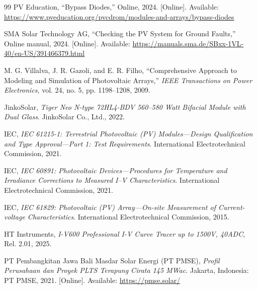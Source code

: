 \begin{thebibliography}{99}
PV Education, ``Bypass Diodes,'' Online, 2024. [Online]. Available: \url{https://www.pveducation.org/pvcdrom/modules-and-arrays/bypass-diodes}

SMA Solar Technology AG, ``Checking the PV System for Ground Faults,'' Online manual, 2024. [Online]. Available: \url{https://manuals.sma.de/SBxx-1VL-40/en-US/391466379.html}

M. G. Villalva, J. R. Gazoli, and E. R. Filho, ``Comprehensive Approach to Modeling and Simulation of Photovoltaic Arrays,'' \textit{IEEE Transactions on Power Electronics}, vol. 24, no. 5, pp. 1198--1208, 2009.

JinkoSolar, \textit{Tiger Neo N-type 72HL4-BDV 560--580 Watt Bifacial Module with Dual Glass}. JinkoSolar Co., Ltd., 2022.

IEC, \textit{IEC 61215-1: Terrestrial Photovoltaic (PV) Modules---Design Qualification and Type Approval---Part 1: Test Requirements}. International Electrotechnical Commission, 2021.

IEC, \textit{IEC 60891: Photovoltaic Devices---Procedures for Temperature and Irradiance Corrections to Measured I--V Characteristics}. International Electrotechnical Commission, 2021.

IEC, \textit{IEC 61829: Photovoltaic (PV) Array---On-site Measurement of Current-voltage Characteristics}. International Electrotechnical Commission, 2015.

HT Instruments, \textit{I-V600 Professional I-V Curve Tracer up to 1500V,
40ADC}, Rel. 2.01, 2025.

PT Pembangkitan Jawa Bali Masdar Solar Energi (PT PMSE), \textit{Profil Perusahaan dan Proyek PLTS Terapung Cirata 145 MWac}. Jakarta, Indonesia: PT PMSE, 2021. [Online]. Available: \url{https://pmse.solar/}

\end{thebibliography}